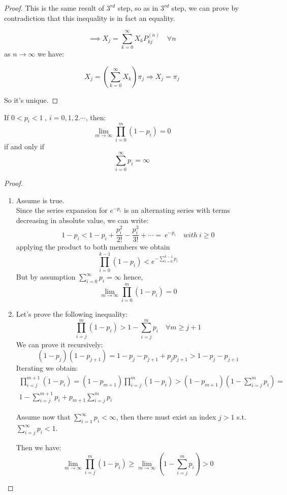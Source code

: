 \begin{proof}
			This is the same result of $3^{rd}$ step, so as in $3^{rd}$ step, we can prove by contradiction that this inequality is in fact an equality.

			$$ \implies X_j = \sum\limits_{k=0}^\infty X_k P_{kj}^{(n)} \quad \forall n $$
			as $n \to \infty$ we have:

			\begin{equation}
				X_j = (\sum\limits_{k=0}^\infty X_k ) \pi_j \Rightarrow X_j = \pi_j
			\end{equation}

			So it's unique.
	\end{proof}

	\begin{lemma}
	  If $0 < p_i < 1 ~,~ i=0,1,2.\cdots $, then:
		\begin{equation}\label{limprodpi}
			\lim_{m \to \infty} \prod_{i=0}^{m}(1-p_i) = 0
		\end{equation}
		if and only if
		\begin{equation}\label{pitoinfty}
			\sum\limits_{i=0}^\infty p_i = \infty
		\end{equation}
	\end{lemma}

	\begin{proof}
		\begin{enumerate}
			\item Assume  is true. \\
				Since the series expansion for $e^{-p_i}$ is an alternating series with terms decreasing in absolute value, we can write:
				\begin{equation}
					1-p_i < 1-p_i + \frac{p_i^2}{2!} - \frac{p_i^3}{3!} + \cdots = ~e^{-p_i} \quad with ~i\ge 0
				\end{equation}
				applying the product to both members we obtain
				\begin{equation}
					\prod_{i=0}^{k-1} (1-p_i) < e^{-\sum\limits_{i=0}^{k-1}p_i}
				\end{equation}
				But by assumption $\sum\limits_{i=0}^\infty p_i = \infty$ hence,
				$$ \lim_{m \to \infty} \prod_{i=0}^{m}(1-p_i) = 0 $$

			\item Let's prove the following inequality:
			$$ \prod_{i=j}^m(1-p_i) > 1-\sum\limits_{i=j}^m p_i \quad \forall m \ge j+1$$
			We can prove it recursively:
			$$(1-p_j)(1-p_{j+1}) = 1-p_j - p_{j+1} + p_j p_{j+1} > 1-p_j - p_{j+1}$$
			Iterating we obtain:
			\begin{eqnarray*}
				\prod_{i=j}^{m+1}(1-p_i) = (1-p_{m+1})\prod_{i=j}^m(1-p_i) > (1-p_{m+1})(1-\sum\limits_{i=j}^m p_i) = \\
				1- \sum\limits_{i=j}^{m+1} p_i + p_{m+1}\sum\limits_{i=j}^m p_i
			\end{eqnarray*}

			Assume now that $\sum\limits_{i=1}^\infty p_i < \infty$, then there must exist an index $j>1$ s.t. $\sum\limits_{i=j}^\infty p_i < 1$.

			Then we have:
			$$ \lim_{m \to \infty} \prod_{i=j}^m (1-p_i) \ge \lim_{m \to \infty} (1-\sum\limits_{i=j}^m p_i) > 0 $$
		\end{enumerate}
	\end{proof}

